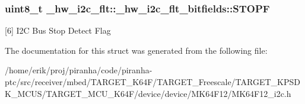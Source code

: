 \subsubsection[{\texorpdfstring{S\+T\+O\+PF}{STOPF}}]{\setlength{\rightskip}{0pt plus 5cm}uint8\+\_\+t \+\_\+hw\+\_\+i2c\+\_\+flt\+::\+\_\+hw\+\_\+i2c\+\_\+flt\+\_\+bitfields\+::\+S\+T\+O\+PF}\hypertarget{struct__hw__i2c__flt_1_1__hw__i2c__flt__bitfields_af4b2625e9e1be78ebd039bc03e316162}{}\label{struct__hw__i2c__flt_1_1__hw__i2c__flt__bitfields_af4b2625e9e1be78ebd039bc03e316162}
\mbox{[}6\mbox{]} I2C Bus Stop Detect Flag 

The documentation for this struct was generated from the following file\+:\begin{DoxyCompactItemize}
\item 
/home/erik/proj/piranha/code/piranha-\/ptc/src/receiver/mbed/\+T\+A\+R\+G\+E\+T\+\_\+\+K64\+F/\+T\+A\+R\+G\+E\+T\+\_\+\+Freescale/\+T\+A\+R\+G\+E\+T\+\_\+\+K\+P\+S\+D\+K\+\_\+\+M\+C\+U\+S/\+T\+A\+R\+G\+E\+T\+\_\+\+M\+C\+U\+\_\+\+K64\+F/device/device/\+M\+K64\+F12/M\+K64\+F12\+\_\+i2c.\+h\end{DoxyCompactItemize}
